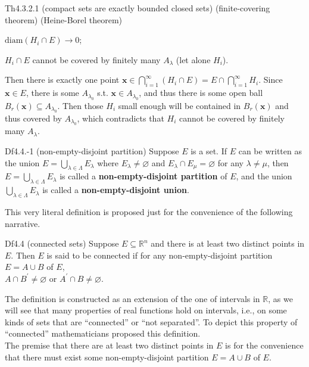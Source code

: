 \documentclass{article}
\begin{document}
\begin{Th}{Th4.3.2.1 (compact sets are exactly bounded closed sets) (finite-covering theorem) (Heine-Borel theorem)}
\begin{compactenum}
\begin{compactenum}
            \item $\text{diam}(H_i\cap E)\rightarrow 0$;
            \item $H_i\cap E$ cannot be covered by finitely many $A_\lambda$ (let alone $H_i$).
        \end{compactenum}
        Then there is exactly one point $\pmb{x}\in\bigcap_{i=1}^\infty (H_i\cap E) = E\cap \bigcap_{i=1}^\infty H_i$. Since $\pmb{x}\in E$, there is some $A_{\lambda_0}$ s.t. $\pmb{x}\in A_{\lambda_0}$, and thus there is some open ball $B_r(\pmb{x})\subseteq A_{\lambda_0}$. Then those $H_i$ small enough will be contained in $B_r(\pmb{x})$ and thus covered by $A_{\lambda_0}$, which contradicts that $H_i$ cannot be covered by finitely many $A_\lambda$.
    \end{compactenum}
\end{Th}

\begin{Df}{Df4.4.-1 (non-empty-disjoint partition)}
    Suppose $E$ is a set. If $E$ can be written as the union $E = \bigcup_{\lambda\in\Lambda} E_\lambda$ where $E_\lambda\neq\varnothing$ and $E_\lambda\cap E_\mu = \varnothing$ for any $\lambda\neq\mu$, then $E = \bigcup_{\lambda\in\Lambda} E_\lambda$ is called a \textbf{non-empty-disjoint partition} of $E$, and the union $\bigcup_{\lambda\in\Lambda} E_\lambda$ is called a \textbf{non-empty-disjoint union}.
\end{Df}

\begin{Rmk}{}
    This very literal definition is proposed just for the convenience of the following narrative.
\end{Rmk}

\begin{Df}{Df4.4 (connected sets)}
    Suppose $E\subseteq\mathbb{R}^n$ and there is at least two distinct points in $E$. Then $E$ is said to be connected if for any non-empty-disjoint partition $E = A\cup B$ of $E$, \\
    $A\cap B^\prime\neq\varnothing$ or $A^\prime\cap B\neq\varnothing$.
\end{Df}

\begin{Rmk}{}
    The definition is constructed as an extension of the one of intervals in $\mathbb{R}$, as we will see that many properties of real functions hold on intervals, i.e., on some kinds of sets that are ``connected'' or ``not separated''. To depict this property of ``connected'' mathematicians proposed this definition.\\
    The premise that there are at least two distinct points in $E$ is for the convenience that there must exist some non-empty-disjoint partition $E = A\cup B$ of $E$.
\end{Rmk}
\end{document}
